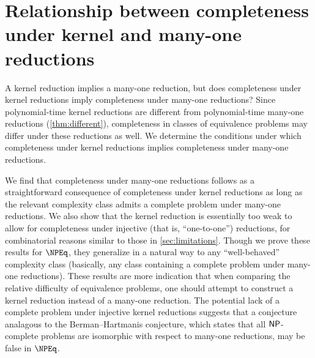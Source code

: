 \section
    [Relationship between completeness under kernel and many-one reductions]
    {Relationship between completeness \\ under kernel and many-one reductions}
\label{sec:npeqcompleteness}
%
A kernel reduction implies a many-one reduction, but does completeness under kernel reductions imply completeness under many-one reductions?
Since polynomial-time kernel reductions are different from polynomial-time many-one reductions (\autoref{thm:different}), completeness in classes of equivalence problems may differ under these reductions as well.
We determine the conditions under which completeness under kernel reductions implies completeness under many-one reductions.

%
We find that completeness under many-one reductions follows as a straightforward consequence of completeness under kernel reductions as long as the relevant complexity class admits a complete problem under many-one reductions.
We also show that the kernel reduction is essentially too weak to allow for completeness under injective (that is, ``one-to-one'') reductions, for combinatorial reasons similar to those in \autoref{sec:limitations}.
Though we prove these results for $\NPEq$, they generalize in a natural way to any ``well-behaved'' complexity class (basically, any class containing a complete problem under many-one reductions).
These results are more indication that when comparing the relative difficulty of equivalence problems, one should attempt to construct a kernel reduction instead of a many-one reduction.
The potential lack of a complete problem under injective kernel reductions suggests that a conjecture analagous to the Berman--Hartmanis conjecture, which states that all ${\mathsf{NP}}$-complete problems are isomorphic with respect to many-one reductions, may be false in $\NPEq$.

